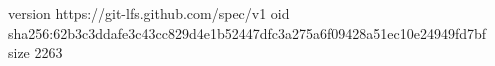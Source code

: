 version https://git-lfs.github.com/spec/v1
oid sha256:62b3c3ddafe3c43cc829d4e1b52447dfc3a275a6f09428a51ec10e24949fd7bf
size 2263
